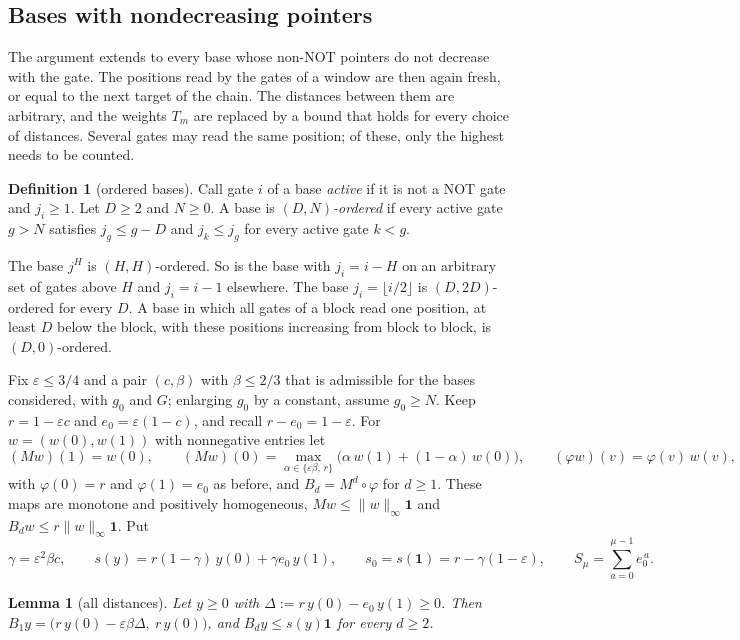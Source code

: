 \documentclass[11pt]{amsart}
\newtheorem{lemma}[theorem]{Lemma}
\theoremstyle{definition}
\newtheorem{definition}[theorem]{Definition}
\theoremstyle{remark}
\newcommand{\eps}{\varepsilon}
\begin{document}
\subsection{Bases with nondecreasing pointers}\label{sec:ordered}

The argument extends to every base whose non-NOT pointers do not decrease with the gate. The
positions read by the gates of a window are then again fresh, or equal to the next target of the
chain. The distances between them are arbitrary, and the weights $T_m$ are replaced by a bound
that holds for every choice of distances. Several gates may read the same position; of these,
only the highest needs to be counted.

\begin{definition}[ordered bases]\label{def:ordered}
Call gate $i$ of a base \emph{active} if it is not a NOT gate and $j_i\ge1$. Let $D\ge2$ and
$N\ge0$. A base is \emph{$(D,N)$-ordered} if every active gate $g>N$ satisfies $j_g\le g-D$ and
$j_k\le j_g$ for every active gate $k<g$.
\end{definition}

\noindent The base $j^H$ is $(H,H)$-ordered. So is the base with $j_i=i-H$ on an arbitrary set of
gates above $H$ and $j_i=i-1$ elsewhere. The base $j_i=\lfloor i/2\rfloor$ is $(D,2D)$-ordered
for every $D$. A base in which all gates of a block read one position, at least $D$ below the
block, with these positions increasing from block to block, is $(D,0)$-ordered.

Fix $\eps\le3/4$ and a pair $(c,\beta)$ with $\beta\le2/3$ that is admissible for the bases
considered, with $g_0$ and $G$; enlarging $g_0$ by a constant, assume $g_0\ge N$. Keep
$r=1-\eps c$ and $e_0=\eps(1-c)$, and recall $r-e_0=1-\eps$. For $w=(w(0),w(1))$ with nonnegative
entries let
\[
(Mw)(1)=w(0),\qquad (Mw)(0)=\max_{\alpha\in\{\eps\beta,\,r\}}\bigl(\alpha\,w(1)+(1-\alpha)\,w(0)\bigr),
\qquad(\varphi w)(v)=\varphi(v)\,w(v),
\]
with $\varphi(0)=r$ and $\varphi(1)=e_0$ as before, and $B_d=M^d\circ\varphi$ for $d\ge1$. These
maps are monotone and positively homogeneous, $Mw\le\|w\|_\infty\mathbf 1$ and
$B_dw\le r\|w\|_\infty\mathbf 1$. Put
\[
\gamma=\eps^2\beta c,\qquad s(y)=r(1-\gamma)\,y(0)+\gamma e_0\,y(1),\qquad
s_0=s(\mathbf 1)=r-\gamma(1-\eps),\qquad S_\mu=\sum_{a=0}^{\mu-1}e_0^{\,a}.
\]

\begin{lemma}[all distances]\label{lem:spacing}
Let $y\ge0$ with $\Delta:=r\,y(0)-e_0\,y(1)\ge0$. Then $B_1y=\bigl(r\,y(0)-\eps\beta\Delta,\ r\,y(0)\bigr)$, and
$B_dy\le s(y)\mathbf 1$ for every $d\ge2$.
\end{lemma}
\end{document}
